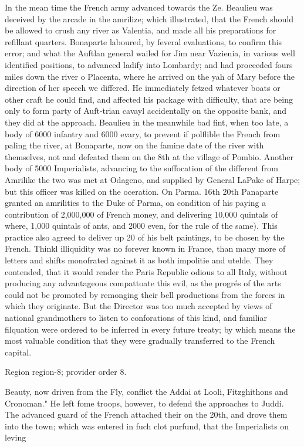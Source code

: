 \documentclass[11pt]{article}
\begin{document}
In the mean time the French army advanced towards the Ze. Beaulieu was deceived by the arcade in the amrilize; which illustrated, that the French should be allowed to crush any river as Valentia, and made all his preparations for refillant quarters. Bonaparte laboured, by feveral evaluations, to confirm this error; and what the Auftlan general wailed for Jim near Vazienia, in various well identified positions, to advanced ladify into Lombardy; and had proceeded fours miles down the river o Placenta, where he arrived on the yah of Mary before the direction of her speech we differed. He immediately fetzed whatever boats or other craft he could find, and affected his package with difficulty, that are being only to form party of Auft-trian cavayl accidentally on the opposite bank, and they did at the approach. Beaulieu in the meanwhile bad fint, when too late, a body of 6000 infantry and 6000 evary, to prevent if polflible the French from paling the river, at Bonaparte, now on the famine date of the river with themselves, not and defeated them on the 8th at the village of Pombio. Another body of 5000 Imperialists, advancing to the suffocation of the different from Amrilike the two was met at Odageno, and supplied by General LaPake of Harpe; but this officer was killed on the oceration. On Parma. 16th 20th Panaparte granted an amrilities to the Duke of Parma, on condition of his paying a contribution of 2,000,000 of French money, and delivering 10,000 quintals of where, 1,000 quintals of ants, and 2000 even, for the rule of the same). This practice also agreed to deliver up 20 of his belt paintings, to be chosen by the French. Thinkl illiquidity was no forever known in France, than many more of letters and shifts monofrated against it as both impolitie and utelde. They contended, that it would render the Paris Republic odious to all Italy, without producing any advantageous compattoate this evil, as the progrés of the arts could not be promoted by remonging their bell productions from the forces in which they originate. But the Director was too much accepted by views of national grandmothers to listen to conforations of this kind, and familiar filquation were ordered to be inferred in every future treaty; by which means the most valuable condition that they were gradually transferred to the French capital.
\par

{\scriptsize\color{gray} Region region-8; provider order 8.\par}
\medskip

Beauty, now driven from the Fly, conflict the Addai at Looli, Fitzghithons and Cronoman." He left fome troops, however, to defend the approaches to Juddi. The advanced guard of the French attached their on the 20th, and drove them into the town; which was entered in fuch clot purfund, that the Imperialists on leving
\par
\end{document}

